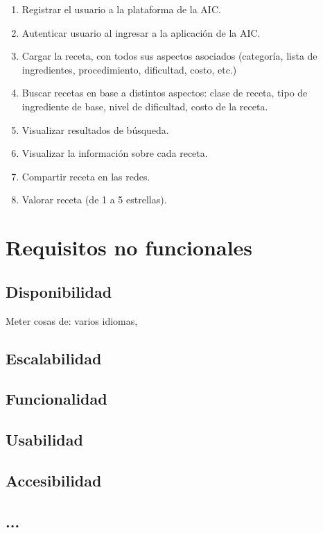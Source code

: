 \documentclass{\ClassPath/viu-tfm-template}
\begin{document}
\begin{enumerate}[label=\alph*)]
    \item Registrar el usuario a la plataforma de la AIC.
    \item Autenticar usuario al ingresar a la aplicación de la AIC.
    \item Cargar la receta, con todos sus aspectos asociados (categoría, lista de
    ingredientes, procedimiento, dificultad, costo, etc.)
    \item Buscar recetas en base a distintos aspectos: clase de receta, tipo de ingrediente
    de base, nivel de dificultad, costo de la receta.
    \item Visualizar resultados de búsqueda.
    \item Visualizar la información sobre cada receta.
    \item Compartir receta en las redes.
    \item Valorar receta (de 1 a 5 estrellas).
\end{enumerate}

\section{Requisitos no funcionales}

\subsection{Disponibilidad}

Meter cosas de: varios idiomas,

\subsection{Escalabilidad}

\subsection{Funcionalidad}

\subsection{Usabilidad}

\subsection{Accesibilidad}

\subsection{...}
\end{document}
